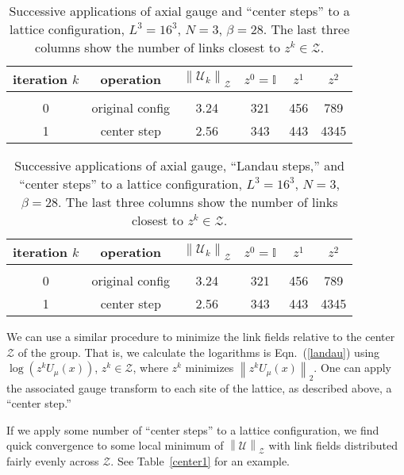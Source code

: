 \documentclass[preprint,aps,prd]{revtex4-2}
\newcommand{\zentrum}{\mathcal{Z}}       %
\newcommand{\config}{\mathcal{U}}
\begin{document}
\begin{table}
  \caption{Successive applications of axial gauge
    and ``center steps'' to
    a lattice configuration, $L^3=16^3$, $N=3$, $\beta=28$.
    The last three columns show the number of links closest
    to $z^k \in \zentrum$.
    \label{center2}}
  \begin{tabular}{cccccc}
    iteration $k$ & operation & $\left\lVert \config_k \right\rVert_\zentrum$
     & $z^0=\mathbb{I}$ & $z^1$ & $z^2$ \\
    \hline\\
    0 & original config & 3.24 & 321 & 456 & 789\\
    1 & center step     & 2.56 & 343 & 443 & 4345 \\
  \end{tabular}
  \end{table}

\begin{table}
  \caption{Successive applications of axial gauge,
    ``Landau steps,'' and ``center steps'' to
    a lattice configuration, $L^3=16^3$, $N=3$, $\beta=28$.
    The last three columns show the number of links closest
    to $z^k \in \zentrum$.
    \label{center3}}
  \begin{tabular}{cccccc}
    iteration $k$ & operation & $\left\lVert \config_k \right\rVert_\zentrum$
     & $z^0=\mathbb{I}$ & $z^1$ & $z^2$ \\
    \hline\\
    0 & original config & 3.24 & 321 & 456 & 789\\
    1 & center step     & 2.56 & 343 & 443 & 4345 \\
  \end{tabular}
  \end{table}

We can use a similar procedure to minimize the link fields
relative to the center $\zentrum$ of the group.
That is, we calculate the logarithms is Eqn.~(\ref{landau})
using $\log\left( z^k U_\mu(x)\right)$, $z^k\in\zentrum$,
where $z^k$ minimizes $\left\lVert z^k U_\mu(x) \right\rVert_2$.
One can apply the associated gauge transform to each site of
the lattice, as described above, a ``center step.''

If we apply some number of ``center steps'' to a lattice
configuration, we find quick convergence to some local
minimum of $\left\lVert \config \right\rVert_\zentrum$ with
link fields distributed fairly evenly across $\zentrum$.
See Table~\ref{center1} for an example.
\end{document}
